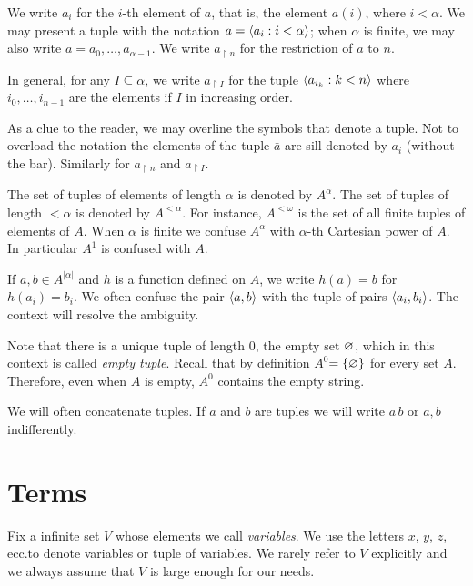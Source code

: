 We write \emph{$a_i$} for the $i$-th element of $a$, that is, the element $a(i)$, where $i<\alpha$. We may present a tuple with the notation \emph{$a=\langle a_i: i<\alpha\rangle$}; when $\alpha$ is finite, we may also write \emph{$a=a_0,\dots,a_{\alpha-1}$}. We write \emph{$a_{\restriction n}$} for the restriction of $a$ to $n$. 

\noindent\llap{\textcolor{red}{\Large\danger}\kern1.5ex}In general, for any $I\subseteq\alpha$, we write \emph{$a_{\restriction I}$} for the tuple $\langle a_{i_k}: k<n\rangle$ where $i_0,\dots,i_{n-1}$ are the elements if $I$ in increasing order.

\noindent\llap{\textcolor{red}{\Large\danger}\kern1.5ex}As a clue to the reader, we may overline the symbols that denote a tuple. Not to overload the notation the elements of the tuple \emph{$\bar a$\/} are sill denoted by $a_i$ (without the bar). Similarly for $a_{\restriction n}$ and $a_{\restriction I}$.

The set of tuples of elements of length $\alpha$ is denoted by \emph{$A^\alpha$}. The set of tuples of length $<\alpha$ is denoted by \emph{$A^{<\alpha}$}. For instance, \emph{$A^{<\omega}$\/} is the set of all finite tuples of elements of $A$. When $\alpha$ is finite we confuse $A^\alpha$ with $\alpha$-th Cartesian power of $A$. In particular $A^1$ is confused with $A$.

If $a,b\in A^{|\alpha|}$ and $h$ is a function defined on $A$, we write $h(a)=b$ for $h(a_i)=b_i$. We often confuse the pair $\langle a,b\rangle$ with the tuple of pairs $\langle a_i,b_i\rangle$. The context will resolve the ambiguity.

Note that there is a unique tuple of length $0$, the empty set $\varnothing$, which in this context is called \emph{empty tuple\/}. Recall that by definition \emph{$A^{0}$\/}$=\{\varnothing\}$ for every set $A$. Therefore, even when $A$ is empty, $A^{0}$ contains the empty string. 

We will often concatenate tuples. If $a$ and $b$ are tuples we will write \emph{$a\,b$\/} or \emph{$a,b$\/} indifferently. 




\section{Terms}\label{terminidef}
Fix a infinite set \emph{$V$\/} whose elements we call \emph{variables}. We use the letters $x$, $y$, $z$, ecc.\@ to denote variables or tuple of variables. We rarely refer to $V$ explicitly and we always assume that $V$ is large enough for our needs.

